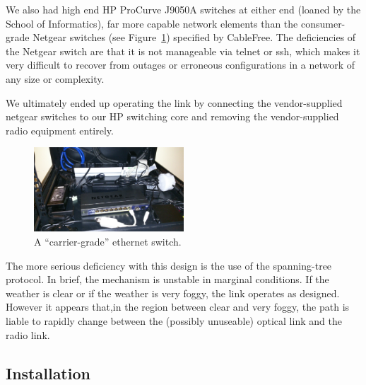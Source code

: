 \documentclass{amsart}
\begin{document}
We also had high end HP ProCurve J9050A switches at either end (loaned
by the School of Informatics), far more capable network elements than
the consumer-grade Netgear switches (see
Figure~\ref{fig:carrier-grade}) specified by CableFree. The
deficiencies of the Netgear switch are that it is not manageable via
telnet or ssh, which makes it very difficult to recover from outages
or erroneous configurations in a network of any size or complexity.

 We ultimately ended up operating the link by
connecting the vendor-supplied netgear switches to our HP switching
core and removing the vendor-supplied radio equipment entirely.
\begin{figure}
  \begin{center}
    \includegraphics[width=0.5\textwidth]{carrier-grade}
  \end{center}
  \caption{A ``carrier-grade'' ethernet switch.}
  \label{fig:carrier-grade}
\end{figure}

The more serious deficiency with this design is the use of the
spanning-tree protocol. In brief, the mechanism is unstable in marginal
conditions. If the weather is clear or if the weather is very foggy,
the link operates as designed. However it appears that,in the region between clear and
very foggy, the path is liable to rapidly change between the (possibly
unuseable) optical link and the radio link. 



\subsection{Installation}
\label{sec:fittings}
\end{document}
